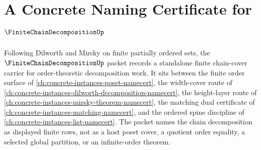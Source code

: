 \chapter{A Concrete Naming Certificate for $\FiniteChainDecompositionUp$}
\label{ch:concrete-instances-finite-chain-decomposition-namecert}

Following Dilworth and Mirsky on finite partially ordered sets, the $\FiniteChainDecompositionUp$ packet records a standalone finite chain-cover carrier for order-theoretic decomposition work. It sits between the finite order surface of \autoref{ch:concrete-instances-poset-namecert}, the width-cover route of \autoref{ch:concrete-instances-dilworth-decomposition-namecert}, the height-layer route of \autoref{ch:concrete-instances-mirsky-theorem-namecert}, the matching dual certificate of \autoref{ch:concrete-instances-matching-namecert}, and the ordered spine discipline of \autoref{ch:concrete-instances-list-namecert}. The packet names the chain decomposition as displayed finite rows, not as a host poset cover, a quotient order equality, a selected global partition, or an infinite-order theorem.

